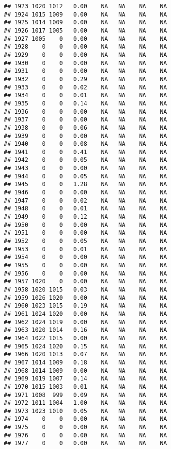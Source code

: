 \documentclass{article}\usepackage{graphicx, color}
\makeatletter
\newenvironment{kframe}{%
 \def\at@end@of@kframe{}%
 \ifinner\ifhmode%
  \def\at@end@of@kframe{\end{minipage}}%
  \begin{minipage}{\columnwidth}%
 \fi\fi%
 \def\FrameCommand##1{\hskip\@totalleftmargin \hskip-\fboxsep
 \colorbox{shadecolor}{##1}\hskip-\fboxsep
     \hskip-\linewidth \hskip-\@totalleftmargin \hskip\columnwidth}%
 \MakeFramed {\advance\hsize-\width
   \@totalleftmargin\z@ \linewidth\hsize
   \@setminipage}}%
 {\par\unskip\endMakeFramed%
 \at@end@of@kframe}
\newenvironment{knitrout}{}{} %
\makeatother
\begin{document}
\begin{knitrout}
\begin{kframe}
\begin{verbatim}
## 1923 1020 1012   0.00    NA   NA    NA    NA
## 1924 1015 1009   0.00    NA   NA    NA    NA
## 1925 1014 1009   0.00    NA   NA    NA    NA
## 1926 1017 1005   0.00    NA   NA    NA    NA
## 1927 1005    0   0.00    NA   NA    NA    NA
## 1928    0    0   0.00    NA   NA    NA    NA
## 1929    0    0   0.00    NA   NA    NA    NA
## 1930    0    0   0.00    NA   NA    NA    NA
## 1931    0    0   0.00    NA   NA    NA    NA
## 1932    0    0   0.29    NA   NA    NA    NA
## 1933    0    0   0.02    NA   NA    NA    NA
## 1934    0    0   0.01    NA   NA    NA    NA
## 1935    0    0   0.14    NA   NA    NA    NA
## 1936    0    0   0.00    NA   NA    NA    NA
## 1937    0    0   0.00    NA   NA    NA    NA
## 1938    0    0   0.06    NA   NA    NA    NA
## 1939    0    0   0.00    NA   NA    NA    NA
## 1940    0    0   0.08    NA   NA    NA    NA
## 1941    0    0   0.41    NA   NA    NA    NA
## 1942    0    0   0.05    NA   NA    NA    NA
## 1943    0    0   0.00    NA   NA    NA    NA
## 1944    0    0   0.05    NA   NA    NA    NA
## 1945    0    0   1.28    NA   NA    NA    NA
## 1946    0    0   0.00    NA   NA    NA    NA
## 1947    0    0   0.02    NA   NA    NA    NA
## 1948    0    0   0.01    NA   NA    NA    NA
## 1949    0    0   0.12    NA   NA    NA    NA
## 1950    0    0   0.00    NA   NA    NA    NA
## 1951    0    0   0.00    NA   NA    NA    NA
## 1952    0    0   0.05    NA   NA    NA    NA
## 1953    0    0   0.01    NA   NA    NA    NA
## 1954    0    0   0.00    NA   NA    NA    NA
## 1955    0    0   0.00    NA   NA    NA    NA
## 1956    0    0   0.00    NA   NA    NA    NA
## 1957 1020    0   0.00    NA   NA    NA    NA
## 1958 1020 1015   0.03    NA   NA    NA    NA
## 1959 1026 1020   0.00    NA   NA    NA    NA
## 1960 1023 1015   0.19    NA   NA    NA    NA
## 1961 1024 1020   0.00    NA   NA    NA    NA
## 1962 1024 1019   0.00    NA   NA    NA    NA
## 1963 1020 1014   0.16    NA   NA    NA    NA
## 1964 1022 1015   0.00    NA   NA    NA    NA
## 1965 1024 1020   0.15    NA   NA    NA    NA
## 1966 1020 1013   0.07    NA   NA    NA    NA
## 1967 1014 1009   0.18    NA   NA    NA    NA
## 1968 1014 1009   0.00    NA   NA    NA    NA
## 1969 1019 1007   0.14    NA   NA    NA    NA
## 1970 1015 1003   0.01    NA   NA    NA    NA
## 1971 1008  999   0.09    NA   NA    NA    NA
## 1972 1011 1004   1.00    NA   NA    NA    NA
## 1973 1023 1010   0.05    NA   NA    NA    NA
## 1974    0    0   0.00    NA   NA    NA    NA
## 1975    0    0   0.00    NA   NA    NA    NA
## 1976    0    0   0.00    NA   NA    NA    NA
## 1977    0    0   0.00    NA   NA    NA    NA

\end{verbatim}
\end{kframe}
\end{knitrout}
\end{document}
